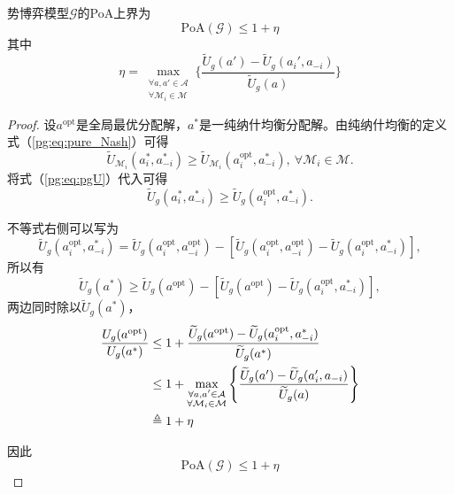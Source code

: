 \begin{proposition}
\label{pg:pro:PoA}
	势博弈模型$\mathcal{G}$的PoA上界为
	\begin{equation}
	\label{pg:pro:eq:High_Bound_PoA}
		\mathrm{PoA}(\mathcal{G}) \leq 1 + \eta
	\end{equation}
	其中
	\begin{equation}
	\label{pg:pro:eq:eta_PoA}
		\eta= \max_{\substack{\forall a,a' \in \mathcal{A}\\ \forall \mathcal{M}_i \in \mathcal{M}}} \Bigg\{ \frac{\widetilde U_g(a') - \widetilde U_g(a_i',a_{-i})}{\widetilde U_g(a)} \Bigg\}
	\end{equation}
	
	\begin{proof}
		设$a^{\text{opt}}$是全局最优分配解，$a^*$是一纯纳什均衡分配解。由纯纳什均衡的定义式（\ref{pg:eq:pure_Nash}）可得
		\begin{equation}
		\label{pg:pro:eq:inequality_Um}
			\widetilde U_{\mathcal{M}_i}(a_i^*,a_{-i}^*) \geq \widetilde U_{\mathcal{M}_i}(a_i^{\text{opt}},a_{-i}^*),\ \forall \mathcal{M}_i \in \mathcal{M}.
		\end{equation}
		将式（\ref{pg:eq:pgU}）代入可得
		\begin{equation}
		\label{pg:pro:eq:inequality_Ug}
			\widetilde U_g(a_i^*,a_{-i}^*) \geq \widetilde U_g(a_i^{\text{opt}},a_{-i}^*).
		\end{equation}
		
		不等式右侧可以写为
		\begin{equation}
		\label{pg:pro:eq:rewrite}
			\widetilde U_g(a_i^{\text{opt}},a_{-i}^*) = \widetilde U_g(a_i^{\text{opt}},a_{-i}^{\text{opt}}) - [\widetilde U_g(a_i^{\text{opt}},a_{-i}^{\text{opt}}) - \widetilde U_g(a_i^{\text{opt}},a_{-i}^*)],
		\end{equation}
		所以有
		\begin{equation}
		\label{pg:pro:eq:relation_opt_nash}
			\widetilde U_g(a^*) \geq \widetilde U_g(a^{\text{opt}}) - [\widetilde U_g(a^{\text{opt}}) - \widetilde U_g(a_i^{\text{opt}},a_{-i}^*)],
		\end{equation}
		两边同时除以$\widetilde U_g(a^*)$，
		\begin{align}
		\label{pg:pro:eq:cal_PoA}
			\frac{U_g(a^{\text{opt}})}{U_g(a^*)} &\leq 1 + \frac{\widetilde U_g(a^{\text{opt}}) - \widetilde U_g(a_i^{\text{opt}},a_{-i}^*)}{\widetilde U_g(a^*)}\notag\\
			&\leq 1 + \max_{\substack{\forall a,a' \in \mathcal{A}\\ \forall \mathcal{M}_i \in \mathcal{M}}} \Bigg\{ \frac{\widetilde U_g(a') - \widetilde U_g(a_i',a_{-i})}{\widetilde U_g(a)} \Bigg\}\notag\\
			&\triangleq 1 +\eta
		\end{align}
		
		因此
		\begin{equation}
		\label{pg:pro:eq:comclusion_PoA}
			\mathrm{PoA}(\mathcal{G}) \leq 1 + \eta
		\end{equation}
	\end{proof}
\end{proposition}



